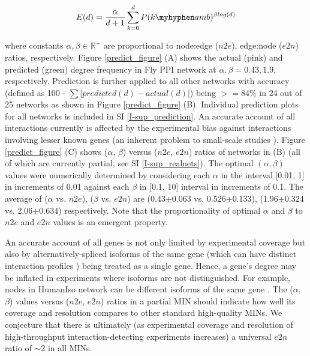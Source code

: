 \documentclass[12pt]{article}
\begin{document}
\begin{equation*}
		E(d)= \frac {\alpha}{d+1}\sum\limits_{k=0}^{d} P(k\myhyphen amb)^{\beta log(d)}
\end{equation*}

\noindent where constants $\alpha, \beta \in \mathbb{R^+}$ are proportional to node:edge ($n2e$), edge:node ($e2n$) ratios, respectively. Figure \ref{predict_figure} (A) shows the actual (pink) and predicted (green)  degree frequency in Fly PPI network   at $\alpha, \beta = 0.43, 1.9$, respectively. Prediction is further applied  to all other networks with accuracy (defined as 100 - $\sum |predicted(d)-actual(d)|$) being $>=84\%$ in 24 out of 25 networks as shown in Figure \ref{predict_figure} (B). Individual prediction plots for all networks is included in SI \ref{I-sup_prediction}.  An accurate account of all interactions currently is affected by the experimental bias against interactions involving lesser known genes (an inherent problem to small-scale studies \cite{rolland_proteome-scale_2014}). Figure \ref{predict_figure} (C) shows ($\alpha$, $\beta$) versus  ($n2e$, $e2n$) ratios of networks in (B) (all of which are currently partial, see SI \ref{I-sup_realnets}). The optimal $(\alpha,\beta)$ values were  numerically determined by considering each $\alpha$ in the interval [0.01, 1] in increments of 0.01 against each $\beta$ in [0.1, 10] interval in increments of 0.1. The average  of ($\alpha$ vs. $n2e$), ($\beta$ vs. $e2n$) are (0.43$\pm$0.063 vs. 0.526$\pm$0.133), (1.96$\pm$0.324 vs. 2.06$\pm$0.634) respectively. Note that the proportionality of optimal $\alpha$ and $\beta$ to $n2e$ and $e2n$ values is an emergent property. 

An accurate account of all genes is not only limited by experimental coverage but also by alternatively-spliced isoforms of the same gene (which can have distinct interaction profiles \cite{yang_widespread_2016}) being treated as a single gene. Hence, a gene's degree may be inflated in experiments where isoforms are not distinguished. For example, nodes in HumanIso network can be different isoforms of the same gene \cite{yang_widespread_2016}. The  ($\alpha$, $\beta$) values versus ($n2e$, $e2n$) ratios in a partial MIN should indicate how well its coverage and resolution compares to other standard high-quality MINs. We conjecture that there is ultimately (as experimental coverage and resolution of high-throughput interaction-detecting experiments increases) a universal $e2n$ ratio of ${\sim}$2 in all MINs.
\end{document}

